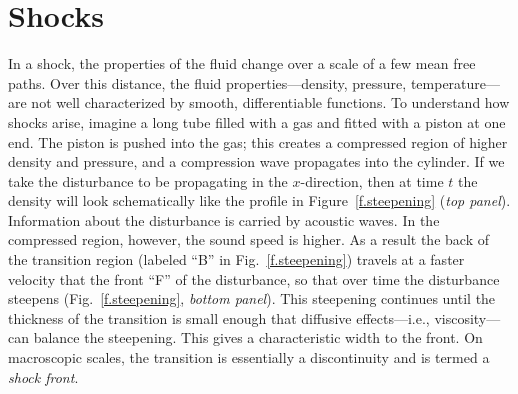 \chapter{Shocks}
\newcommand{\gpo}{\ensuremath{(\gamma+1)}}
\newcommand{\gmo}{\ensuremath{(\gamma-1)}}

In a shock, the properties of the fluid change over a scale of a few mean free paths.  Over this distance, the fluid properties---density, pressure, temperature---are not well characterized by smooth, differentiable functions. To understand how shocks arise, imagine a long tube filled with a gas and fitted with a piston at one end. The piston is pushed into the gas; this creates a compressed region of higher density and pressure, and a compression wave propagates into the cylinder.  If we take the disturbance to be propagating in the $x$-direction, then at time $t$ the density will look schematically like the profile in Figure~\ref{f.steepening} (\emph{top panel}).
Information about the disturbance is carried by acoustic waves.  In the compressed region, however, the sound speed is higher.  As a result the back of the transition region (labeled ``B'' in Fig.~\ref{f.steepening}) travels at a faster velocity that the front ``F'' of the disturbance, so that over time the disturbance steepens (Fig.~\ref{f.steepening}, \emph{bottom panel}). This steepening continues until the thickness of the transition is small enough that diffusive effects---i.e., viscosity---can balance the steepening.  This gives a characteristic width to the front.  On macroscopic scales, the transition is essentially a discontinuity and is termed a \emph{shock front}.

